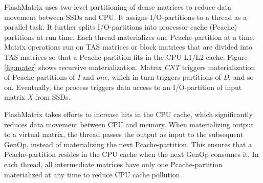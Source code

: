 FlashMatrix uses two-level partitioning of dense matrices
to reduce data movement between SSDs and CPU. It assigns I/O-partitions
to a thread as a parallel task.
It further splits I/O-partitions into processor cache (Pcache)
partitions at run time.  Each thread materializes one Pcache-partition
at a time. Matrix operations run on TAS matrices or block matrices that are
divided into TAS matrices so that a Pcache-partition fits in the CPU L1/L2 cache.
Figure \ref{fig:mater} shows recursive materialization.
Matrix \textit{CNT} triggers materialization of
Pcache-partitions of \textit{I} and \textit{one}, which in turn triggers 
partitions of \textit{D}, and so on. Eventually, the process triggers data access
to an I/O-partition of input matrix \textit{X} from SSDs. 

FlashMatrix takes efforts to increase hits in the CPU cache, which 
significantly reduces data movement between CPU and memory.
When materializing output to a virtual matrix, the thread passes
the output as input to the subsequent
GenOp, instead of materializing the next Pcache-partition.
This ensures that a Pcache-partition resides in the CPU cache
when the next GenOp consumes it. 
In each thread, all intermediate matrices have only one 
Pcache-partition materialized
at any time to reduce CPU cache pollution.




\vspace{-8pt}
